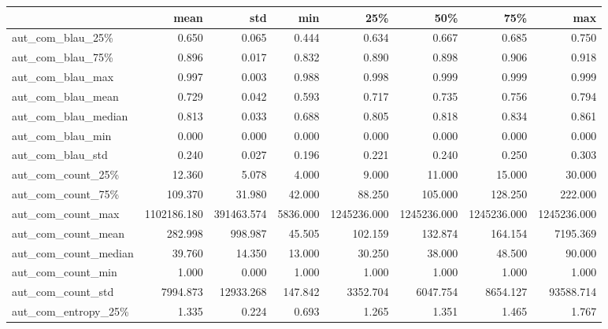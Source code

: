 \begin{table}
\centering
\begin{tabular}{lrrrrrrr}
\toprule
{} &        mean &        std &      min &         25\% &         50\% &         75\% &         max \\
\midrule
aut\_com\_blau\_25\%       &       0.650 &      0.065 &    0.444 &       0.634 &       0.667 &       0.685 &       0.750 \\
aut\_com\_blau\_75\%       &       0.896 &      0.017 &    0.832 &       0.890 &       0.898 &       0.906 &       0.918 \\
aut\_com\_blau\_max       &       0.997 &      0.003 &    0.988 &       0.998 &       0.999 &       0.999 &       0.999 \\
aut\_com\_blau\_mean      &       0.729 &      0.042 &    0.593 &       0.717 &       0.735 &       0.756 &       0.794 \\
aut\_com\_blau\_median    &       0.813 &      0.033 &    0.688 &       0.805 &       0.818 &       0.834 &       0.861 \\
aut\_com\_blau\_min       &       0.000 &      0.000 &    0.000 &       0.000 &       0.000 &       0.000 &       0.000 \\
aut\_com\_blau\_std       &       0.240 &      0.027 &    0.196 &       0.221 &       0.240 &       0.250 &       0.303 \\
aut\_com\_count\_25\%      &      12.360 &      5.078 &    4.000 &       9.000 &      11.000 &      15.000 &      30.000 \\
aut\_com\_count\_75\%      &     109.370 &     31.980 &   42.000 &      88.250 &     105.000 &     128.250 &     222.000 \\
aut\_com\_count\_max      & 1102186.180 & 391463.574 & 5836.000 & 1245236.000 & 1245236.000 & 1245236.000 & 1245236.000 \\
aut\_com\_count\_mean     &     282.998 &    998.987 &   45.505 &     102.159 &     132.874 &     164.154 &    7195.369 \\
aut\_com\_count\_median   &      39.760 &     14.350 &   13.000 &      30.250 &      38.000 &      48.500 &      90.000 \\
aut\_com\_count\_min      &       1.000 &      0.000 &    1.000 &       1.000 &       1.000 &       1.000 &       1.000 \\
aut\_com\_count\_std      &    7994.873 &  12933.268 &  147.842 &    3352.704 &    6047.754 &    8654.127 &   93588.714 \\
aut\_com\_entropy\_25\%    &       1.335 &      0.224 &    0.693 &       1.265 &       1.351 &       1.465 &       1.767 \\

\end{tabular}
\end{table}
